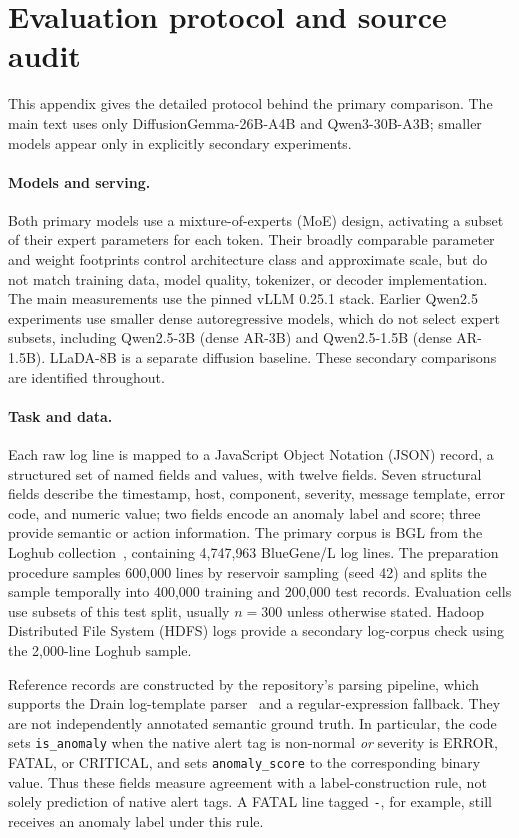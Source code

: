 \section{Evaluation protocol and source audit}
\label{app:protocol}

This appendix gives the detailed protocol behind the primary comparison.
The main text uses only DiffusionGemma-26B-A4B and Qwen3-30B-A3B;
smaller models appear only in explicitly secondary experiments.

\paragraph{Models and serving.}

Both primary models use a mixture-of-experts (MoE) design, activating a
subset of their expert parameters for each token. Their broadly comparable
parameter and weight footprints control architecture class and approximate
scale, but do not match training data, model quality, tokenizer, or decoder
implementation. The main measurements use the pinned vLLM 0.25.1 stack.
Earlier Qwen2.5 experiments use smaller dense autoregressive models,
which do not select expert subsets, including Qwen2.5-3B (dense AR-3B)
and Qwen2.5-1.5B (dense AR-1.5B). LLaDA-8B is a separate diffusion
baseline. These secondary comparisons are identified throughout.

\paragraph{Task and data.}
Each raw log line is mapped to a JavaScript Object Notation (JSON) record,
a structured set of named fields and values, with twelve fields. Seven
structural fields describe the timestamp, host, component, severity,
message template, error code, and numeric value; two fields encode an
anomaly label and score; three provide semantic or action information.
The primary corpus is BGL from the Loghub collection~\cite{loghub}, containing
4{,}747{,}963 BlueGene/L log lines. The preparation procedure samples
600{,}000 lines by reservoir sampling (seed 42) and splits the sample
temporally into 400{,}000 training and 200{,}000 test records.
Evaluation cells use subsets of this test split, usually $n{=}300$ unless
otherwise stated. Hadoop Distributed File System (HDFS) logs provide a
secondary log-corpus check using the
2{,}000-line Loghub sample.

Reference records are constructed by the repository's parsing pipeline,
which supports the Drain log-template parser~\cite{drain} and a
regular-expression fallback. They are not
independently annotated semantic ground truth. In particular, the code
sets \texttt{is\_anomaly} when the native alert tag is non-normal
\emph{or} severity is ERROR, FATAL, or CRITICAL, and sets
\texttt{anomaly\_score} to the corresponding binary value. Thus these
fields measure agreement with a label-construction rule, not solely
prediction of native alert tags. A FATAL line tagged \texttt{-}, for
example, still receives an anomaly label under this rule.

